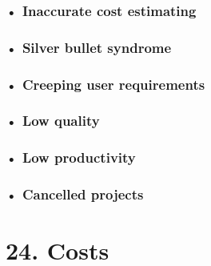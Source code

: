 \documentclass[
]{article}
\begin{document}
\hypertarget{inaccurate-cost-estimating}{%
\subsubsection{\texorpdfstring{• Inaccurate cost estimating
}{• Inaccurate cost estimating }}\label{inaccurate-cost-estimating}}

\hypertarget{silver-bullet-syndrome}{%
\subsubsection{• Silver bullet syndrome}\label{silver-bullet-syndrome}}

\hypertarget{creeping-user-requirements}{%
\subsubsection{\texorpdfstring{• Creeping user requirements
}{• Creeping user requirements }}\label{creeping-user-requirements}}

\hypertarget{low-quality}{%
\subsubsection{\texorpdfstring{• Low quality
}{• Low quality }}\label{low-quality}}

\hypertarget{low-productivity}{%
\subsubsection{\texorpdfstring{• Low productivity
}{• Low productivity }}\label{low-productivity}}

\hypertarget{cancelled-projects}{%
\subsubsection{\texorpdfstring{• Cancelled projects
}{• Cancelled projects }}\label{cancelled-projects}}

\hypertarget{costs}{%
\section{24. Costs}\label{costs}}
\end{document}
